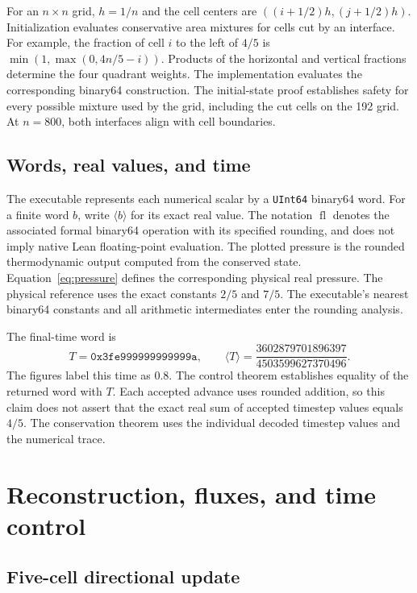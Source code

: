 \documentclass[11pt]{article}
\newcommand{\code}[1]{\texttt{#1}}
\newcommand{\val}[1]{\langle #1\rangle}
\newcommand{\fl}{\operatorname{fl}}
\begin{document}
For an $n\times n$ grid, $h=1/n$ and the cell centers are $((i+1/2)h,(j+1/2)h)$.  Initialization evaluates conservative area mixtures for cells cut by an interface.  For example, the fraction of cell $i$ to the left of $4/5$ is $\min(1,\max(0,4n/5-i))$.  Products of the horizontal and vertical fractions determine the four quadrant weights.  The implementation evaluates the corresponding binary64 construction.  The initial-state proof establishes safety for every possible mixture used by the grid, including the cut cells on the 192 grid.  At $n=800$, both interfaces align with cell boundaries.

\subsection{Words, real values, and time}

The executable represents each numerical scalar by a \code{UInt64} binary64 word.  For a finite word $b$, write $\val{b}$ for its exact real value.  The notation $\fl$ denotes the associated formal binary64 operation with its specified rounding, and does not imply native Lean floating-point evaluation.  The plotted pressure is the rounded thermodynamic output computed from the conserved state.  Equation~\eqref{eq:pressure} defines the corresponding physical real pressure.  The physical reference uses the exact constants $2/5$ and $7/5$.  The executable's nearest binary64 constants and all arithmetic intermediates enter the rounding analysis.

The final-time word is
\begin{equation}
T=\code{0x3fe999999999999a},\qquad
\val{T}=\frac{3602879701896397}{4503599627370496}.
\end{equation}
The figures label this time as $0.8$.  The control theorem establishes equality of the returned word with $T$.  Each accepted advance uses rounded addition, so this claim does not assert that the exact real sum of accepted timestep values equals $4/5$.  The conservation theorem uses the individual decoded timestep values and the numerical trace.

\section{Reconstruction, fluxes, and time control}

\subsection{Five-cell directional update}
\end{document}
